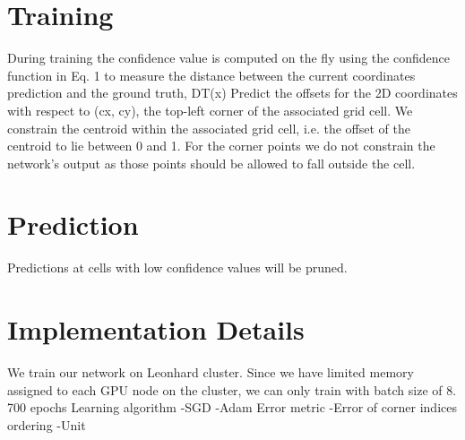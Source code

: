 \section{Training}
During training the confidence value is computed on the fly using the confidence function in Eq. 1 to measure the distance between the current coordinates prediction and the ground truth, DT(x)
Predict the offsets for the 2D coordinates with respect to (cx, cy), the top-left corner of the associated grid cell.
We constrain the centroid within the associated grid cell, i.e. the offset of the centroid to lie between 0 and 1. For the corner points we do not constrain the network’s output as those points should be allowed to fall outside the cell.

\section{Prediction}
Predictions at cells with low confidence values will be pruned.

\section{Implementation Details}

We train our network on Leonhard cluster. Since we have limited memory assigned to each GPU node  on the cluster, we can only train with batch size of 8.
700 epochs
Learning algorithm
-SGD
-Adam
Error metric
-Error of corner indices ordering
-Unit

